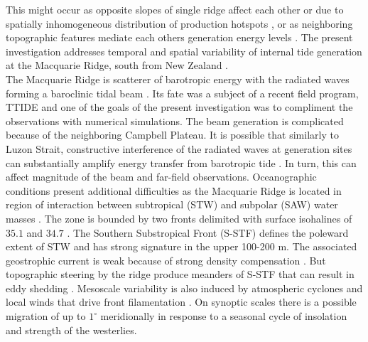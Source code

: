 \documentclass[12pt]{article}
\begin{document}
This 
might occur as opposite slopes of single ridge affect each other \citep{nash2004internal, 
zilberman2011incoherent, echeverri2010internal} or due to spatially inhomogeneous distribution of 
production hotspots \citep{osborne2011spatial, ponte2013coastal}, or as neighboring topographic 
features mediate each others generation energy levels \citep{xing1998three, buijsman2012modeling, 
klymak2013parameterizing, buijsman2014three}. The present investigation addresses 
temporal and spatial variability of internal tide generation at the Macquarie Ridge, 
south from New Zealand .\\

The Macquarie Ridge is scatterer of barotropic energy with the radiated waves forming a baroclinic 
tidal beam \citep{zhao2016global}. Its fate was a subject of a recent field 
program, TTIDE \citep{pinkel2015breaking} and one of the goals of the present investigation 
was to compliment the observations with numerical simulations. The beam generation is complicated 
because of the neighboring Campbell Plateau. It is possible that similarly to Luzon Strait, 
constructive interference of the radiated waves at generation sites can substantially amplify 
energy transfer from barotropic tide \citep{buijsman2012double, echeverri2010internal}. In turn, 
this can affect magnitude of the beam and far-field observations. Oceanographic conditions present 
additional difficulties as the Macquarie Ridge is located in region of interaction between 
subtropical (STW) and subpolar (SAW) water masses \citep{chiswell2015physical}. 
The zone is bounded by two fronts delimited with surface isohalines of $35.1$ and $34.7$ 
\citep{belkin1996southern, hamilton2006structure} . The Southern 
Substropical Front 
(S-STF) defines the poleward extent of STW and has strong signature in the upper 100-200 m. The 
associated geostrophic current is weak because of strong density compensation 
\citep{graham2013dynamical}. But topographic 
steering by the ridge produce meanders of S-STF that can result in eddy shedding 
\citep{smith2013interaction}. Mesoscale variability is also induced by atmospheric cyclones and 
local winds that drive front filamentation \citep{james2002summer}. On synoptic scales there is a 
possible 
migration of up to $1^{\circ}$ meridionally \citep{smith2017variability} in response to a seasonal 
cycle of 
insolation and strength of the westerlies.\\
\end{document}
